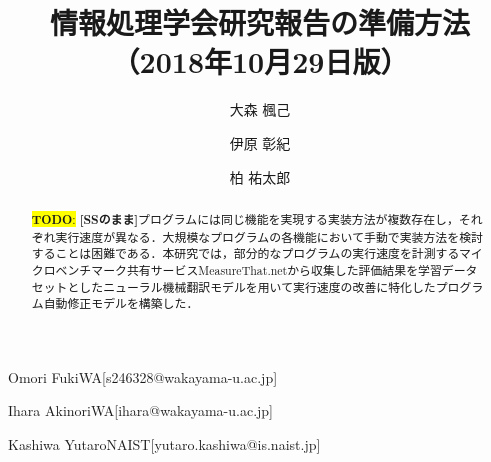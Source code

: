 \documentclass[submit,ses,noauthor]{ipsj}
\newcommand{\todo}[1]{\colorbox{yellow}{{\bf TODO}:}{\color{red} {\textbf{[#1]}}}}
\begin{document}
\title{情報処理学会研究報告の準備方法\\
（2018年10月29日版）}





\author{大森 楓己}{Omori Fuki}{WA}[s246328@wakayama-u.ac.jp]
\author{伊原 彰紀}{Ihara Akinori}{WA}[ihara@wakayama-u.ac.jp]
\author{柏 祐太郎}{Kashiwa Yutaro}{NAIST}[yutaro.kashiwa@is.naist.jp]


\begin{abstract}
\todo{SSのまま}プログラムには同じ機能を実現する実装方法が複数存在し，それぞれ実行速度が異なる．大規模なプログラムの各機能において手動で実装方法を検討することは困難である．本研究では，部分的なプログラムの実行速度を計測するマイクロベンチマーク共有サービスMeasureThat.netから収集した評価結果を学習データセットとしたニューラル機械翻訳モデルを用いて実行速度の改善に特化したプログラム自動修正モデルを構築した．
\end{abstract}


%
%
%

\maketitle
\end{document}
